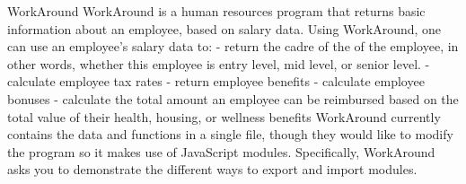 WorkAround
    WorkAround is a human resources program that returns basic information about an employee, based on salary data. Using WorkAround, one can use an employee’s salary data to:
        - return the cadre of the of the employee, in other words, whether this employee is entry level, mid level, or senior level.
        - calculate employee tax rates
        - return employee benefits
        - calculate employee bonuses
        - calculate the total amount an employee can be reimbursed based on the total value of their health, housing, or wellness benefits
WorkAround currently contains the data and functions in a single file, though they would like to modify the program so it makes use of JavaScript modules. Specifically, WorkAround asks you to demonstrate the different ways to export and import modules.
